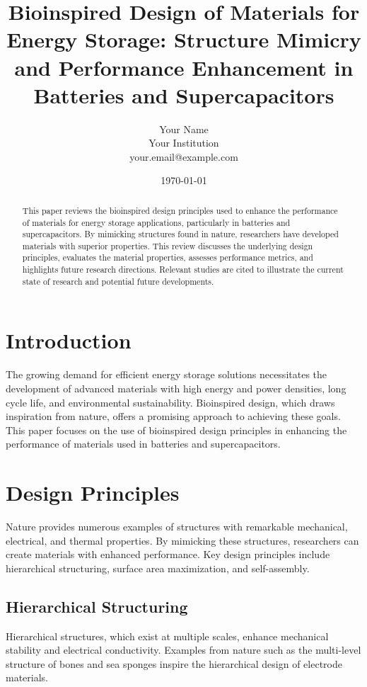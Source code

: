 \documentclass[12pt]{article}
\title{Bioinspired Design of Materials for Energy Storage: Structure Mimicry and Performance Enhancement in Batteries and Supercapacitors}
\author{Your Name\\ Your Institution\\ your.email@example.com}
\date{\today}
\begin{document}
\maketitle

\begin{abstract}
This paper reviews the bioinspired design principles used to enhance the performance of materials for energy storage applications, particularly in batteries and supercapacitors. By mimicking structures found in nature, researchers have developed materials with superior properties. This review discusses the underlying design principles, evaluates the material properties, assesses performance metrics, and highlights future research directions. Relevant studies are cited to illustrate the current state of research and potential future developments.
\end{abstract}

\section{Introduction}
The growing demand for efficient energy storage solutions necessitates the development of advanced materials with high energy and power densities, long cycle life, and environmental sustainability. Bioinspired design, which draws inspiration from nature, offers a promising approach to achieving these goals. This paper focuses on the use of bioinspired design principles in enhancing the performance of materials used in batteries and supercapacitors.

\section{Design Principles}
Nature provides numerous examples of structures with remarkable mechanical, electrical, and thermal properties. By mimicking these structures, researchers can create materials with enhanced performance. Key design principles include hierarchical structuring, surface area maximization, and self-assembly.

\subsection{Hierarchical Structuring}
Hierarchical structures, which exist at multiple scales, enhance mechanical stability and electrical conductivity. Examples from nature such as the multi-level structure of bones and sea sponges inspire the hierarchical design of electrode materials.
\end{document}
